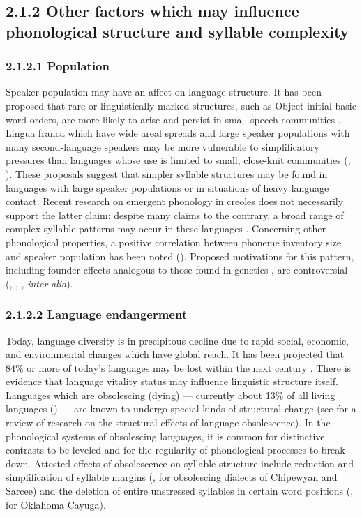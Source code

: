 \subsection{2.1.2 Other factors which may influence phonological structure and syllable complexity}
\subsubsection{\textbf{2.1.2.1} \textbf{Population}}

  Speaker population may have an affect on language structure. It has been proposed that rare or linguistically marked structures, such as Object-initial basic word orders, are more likely to arise and persist in small speech communities \citep{Nettle1999a}. Lingua franca which have wide areal spreads and large speaker populations with many second-language speakers may be more vulnerable to simplificatory pressures than languages whose use is limited to small, close-knit communities (\citealt{Nettle1999b}, \citealt{LupyanDale2010}). These proposals suggest that simpler syllable structures may be found in languages with large speaker populations or in situations of heavy language contact. Recent research on emergent phonology in creoles does not necessarily support the latter claim: despite many claims to the contrary, a broad range of complex syllable patterns may occur in these languages \citep{Schramm2014}. Concerning other phonological properties, a positive correlation between phoneme inventory size and speaker population has been noted (\citealt{HayBauer2007}). Proposed motivations for this pattern, including founder effects analogous to those found in genetics \citep{Atkinson2011}, are controversial (\citealt{Bybee2011}, \citealt{MaddiesonEtAl2011}, \citealt{HunleyEtAl2012}, \textit{inter} \textit{alia}).


\subsubsection{\textbf{2.1.2.2} \textbf{Language} \textbf{endangerment}}

  Today, language diversity is in precipitous decline due to rapid social, economic, and environmental changes which have global reach. It has been projected that 84\% or more of today’s languages may be lost within the next century \citep[113-114]{Nettle1999b}. There is evidence that language vitality status may influence linguistic structure itself. Languages which are obsolescing (dying) — currently about 13\% of all living languages (\citealt{SimonsFennig2018}) — are known to undergo special kinds of structural change (see \citealt{Romaine2010} for a review of research on the structural effects of language obsolescence). In the phonological systems of obsolescing languages, it is common for distinctive contrasts to be leveled and for the regularity of phonological processes to break down. Attested effects of obsolescence on syllable structure include reduction and simplification of syllable margins (\citealt{Cook1989}, for obsolescing dialects of Chipewyan and Sarcee) and the deletion of entire unstressed syllables in certain word positions (\citealt{Mithun1989}, for Oklahoma Cayuga).


